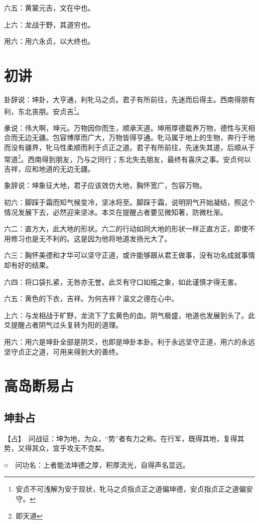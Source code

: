 \documentclass[12pt,oneside]{book}
\begin{document}
六五：黄裳元吉，文在中也。

上六：龙战于野，其道穷也。

用六：用六永贞，以大终也。

\section{初讲}
卦辞说：坤卦，大亨通，利牝马之贞。君子有所前往，先迷而后得主。西南得朋有利，东北丧朋。安贞吉\footnote{安贞不可浅解为安于现状，牝马之贞指贞正之道偏坤德，安贞指贞正之道偏安守。}。

彖说：伟大啊，坤元。万物因你而生，顺承天道。坤用厚德载养万物，德性与天相合而无边无疆。包容博厚而广大，万物皆得亨通。牝马属于地上的生物，奔行于地而没有疆界，牝马性柔顺而利于贞正之道。君子有所前往，先迷失其道，后顺从于常道\footnote{即天道}。西南得到朋友，乃与之同行；东北失去朋友，最终有喜庆之事。安贞何以吉祥，应和地道的无边无疆。

象辞说：坤象征大地，君子应该效仿大地，胸怀宽广，包容万物。


初六：脚踩于霜而知气候变冷，坚冰将至。脚踩于霜，说明阴气开始凝结，照这个情况发展下去，必然迎来坚冰。本爻在提醒占者要见微知著，防微杜渐。

六二：直方大，此大地的形状。六二的行动如同大地的形状一样正直方正，即使不用修习也是无不利的。这是因为他将地道发扬光大了。

六三：胸怀美德和才华可以坚守正道，或许能够跟从君王做事，没有功名成就事情却有好的结果。

六四：将口袋扎紧，无咎亦无誉。此爻有守口如瓶之象，如此谨慎才得无害。

六五：黄色的下衣，吉祥。为何吉祥？温文之德在心中。

上六：与龙相战于旷野，龙流下了玄黄色的血。阴气极盛，地道也发展到头了。此爻提醒占者阴气过头复转为阳的道理。

用六：用六是坤卦全部是阴爻，也即是坤卦本卦。利于永远坚守正道，用六的永远坚守贞正之道，可用来得到大的善终。


\section{高岛断易占}
\subsection{坤卦占}
【占】　问战征：坤为地，为众，“势”者有力之称。在行军，既得其地，复得其势，又得其众，宜乎攻无不克矣。

○　问功名：上者能法坤德之厚，积厚流光，自得声名显远。
\end{document}

